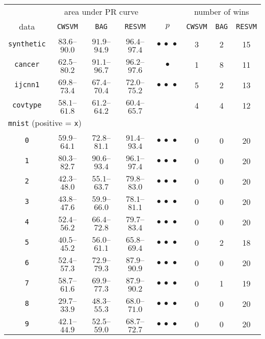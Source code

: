 \begin{table}[!h]
\centering
\begin{tabular}{cccccccc}
\toprule
 & \multicolumn{3}{c}{area under PR curve} & & \multicolumn{3}{c}{number of wins} \\ \cline{2-4} \cline{6-8}
data & \texttt{CWSVM} & \texttt{BAG} & \texttt{RESVM} & $p$ & \texttt{CWSVM} & \texttt{BAG} & \texttt{RESVM} \\
\midrule
\texttt{synthetic} & $83.6$--$90.0$ & $91.9$--$94.9$ & $96.4$--$97.4$ & $\bullet\ \bullet\ \bullet$ & 3 & 2 & 15\\
\texttt{cancer} & $62.5$--$80.2$ & $91.1$--$96.7$ & $96.2$--$97.6$ & $\bullet$ & 1 & 8 & 11\\ 
\texttt{ijcnn1} & $69.8$--$73.4$ & $67.4$--$70.4$ & $72.0$--$75.2$ & $\bullet\ \bullet\ \bullet$ & 5 & 2 & 13\\
\texttt{covtype} & $58.1$--$61.8$ & $61.2$--$64.2$ & $60.4$--$65.7$ &  & 4 & 4 & 12\\ 
\multicolumn{3}{l}{\texttt{mnist} (positive = \texttt{x})} \\
\texttt{0} & $59.9$--$64.1$ & $72.8$--$81.1$ & $91.4$--$93.4$ & $\bullet\ \bullet\ \bullet$ & 0 & 0 & 20\\ 
\texttt{1} & $80.3$--$82.7$ & $90.6$--$93.4$ & $96.1$--$97.4$ & $\bullet\ \bullet\ \bullet$ & 0 & 0 & 20\\ 
\texttt{2} & $42.3$--$48.0$ & $55.1$--$63.7$ & $79.8$--$83.0$ & $\bullet\ \bullet\ \bullet$ & 0 & 0 & 20\\ 
\texttt{3} & $43.8$--$47.6$ & $59.9$--$66.0$ & $78.1$--$81.1$ & $\bullet\ \bullet\ \bullet$ & 0 & 0 & 20\\ 
\texttt{4} & $52.4$--$56.2$ & $66.4$--$72.8$ & $79.7$--$83.4$ & $\bullet\ \bullet\ \bullet$ & 0 & 0 & 20\\ 
\texttt{5} & $40.5$--$45.2$ & $56.0$--$61.1$ & $65.8$--$69.4$ & $\bullet\ \bullet\ \bullet$ & 0 & 2 & 18\\ 
\texttt{6} & $52.4$--$57.3$ & $72.9$--$79.3$ & $87.9$--$90.9$ & $\bullet\ \bullet\ \bullet$ & 0 & 0 & 20\\ 
\texttt{7} & $58.7$--$61.6$ & $69.9$--$77.3$ & $87.9$--$90.2$ & $\bullet\ \bullet\ \bullet$ & 0 & 1 & 19\\ 
\texttt{8} & $29.7$--$33.9$ & $48.3$--$55.3$ & $68.0$--$71.0$ & $\bullet\ \bullet\ \bullet$ & 0 & 0 & 20\\ 
\texttt{9} & $42.1$--$44.9$ & $52.5$--$59.0$ & $68.7$--$72.7$ & $\bullet\ \bullet\ \bullet$ & 0 & 0 & 20\\ 

\end{tabular}
\end{table}
